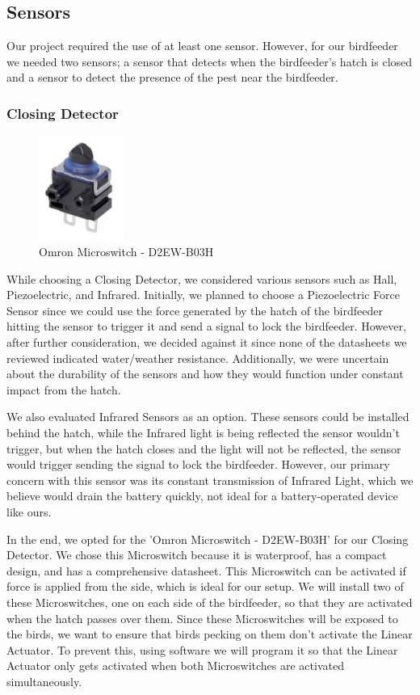 \documentclass[12pt,a4paper]{article}
\begin{document}
\subsection{Sensors}
Our project required the use of at least one sensor. However, for our birdfeeder we needed two sensors; a sensor that detects when the birdfeeder’s hatch is closed and a sensor to detect the presence of the pest near the birdfeeder. 
\subsubsection{Closing Detector}

\begin{figure}[h]
    \centering
    \includegraphics[width=0.25\textwidth]{images/Microswitch.png}
    \caption{Omron Microswitch - D2EW-B03H \cite{switch}}
\end{figure}

While choosing a Closing Detector, we considered various sensors such as Hall, Piezoelectric, and Infrared. Initially, we planned to choose a Piezoelectric Force Sensor since we could use the force generated by the hatch of the birdfeeder hitting the sensor to trigger it and send a signal to lock the birdfeeder. However, after further consideration, we decided against it since none of the datasheets we reviewed indicated water/weather resistance. Additionally, we were uncertain about the durability of the sensors and how they would function under constant impact from the hatch. 

We also evaluated Infrared Sensors as an option. These sensors could be installed behind the hatch, while the Infrared light is being reflected the sensor wouldn't trigger, but when the hatch closes and the light will not be reflected, the sensor would trigger sending the signal to lock the birdfeeder. However, our primary concern with this sensor was its constant transmission of Infrared Light, which we believe would drain the battery quickly, not ideal for a battery-operated device like ours. 

In the end, we opted for the 'Omron Microswitch - D2EW-B03H' for our Closing Detector. We chose this Microswitch because it is waterproof, has a compact design, and has a comprehensive datasheet. This Microswitch can be activated if force is applied from the side, which is ideal for our setup. We will install two of these Microswitches, one on each side of the birdfeeder, so that they are activated when the hatch passes over them. Since these Microswitches will be exposed to the birds, we want to ensure that birds pecking on them don't activate the Linear Actuator. To prevent this, using software we will program it so that the Linear Actuator only gets activated when both Microswitches are activated simultaneously. 
\end{document}
